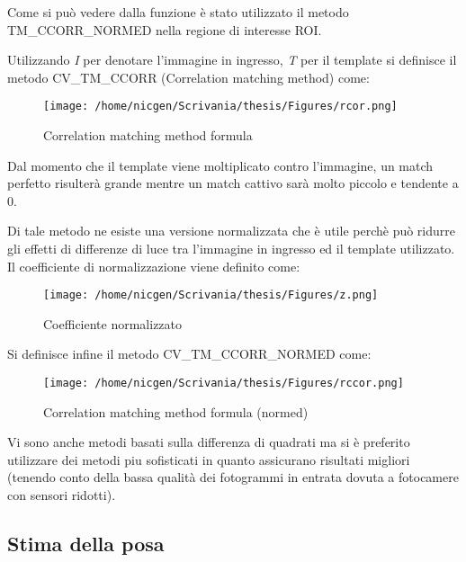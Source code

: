 Come si può vedere dalla funzione è stato utilizzato il metodo TM\_CCORR\_NORMED nella regione di interesse ROI. 

Utilizzando \textit{I} per denotare l'immagine in ingresso, \textit{T} per il template si definisce il metodo CV\_TM\_CCORR (Correlation matching method) come: 

\begin{figure}[H]\centering  
\texttt{[image: /home/nicgen/Scrivania/thesis/Figures/rcor.png]}
\caption[Correlation matching method formula]{Correlation matching method formula}
\label{pic-a}
\end{figure}

Dal momento che il template viene moltiplicato contro l'immagine, un match perfetto risulterà grande mentre un match cattivo sarà molto piccolo e tendente a 0.

Di tale metodo ne esiste una versione normalizzata che è utile perchè può ridurre gli effetti di differenze di luce tra l'immagine in ingresso ed il template utilizzato. Il coefficiente di normalizzazione viene definito come:

\begin{figure}[H]\centering  
\texttt{[image: /home/nicgen/Scrivania/thesis/Figures/z.png]}
\caption[Coefficiente normalizzato]{Coefficiente normalizzato}
\label{pic-a}
\end{figure}

Si definisce infine il metodo CV\_TM\_CCORR\_NORMED come:

\begin{figure}[H]\centering  
\texttt{[image: /home/nicgen/Scrivania/thesis/Figures/rccor.png]}
\caption[Correlation matching method formula (normed)]{Correlation matching method formula (normed)}
\label{pic-a}
\end{figure}

Vi sono anche metodi basati sulla differenza di quadrati ma si è preferito utilizzare dei metodi piu sofisticati in quanto assicurano risultati migliori (tenendo conto della bassa qualità dei fotogrammi in entrata dovuta a fotocamere con sensori ridotti).





\newpage
\subsection{Stima della posa}

